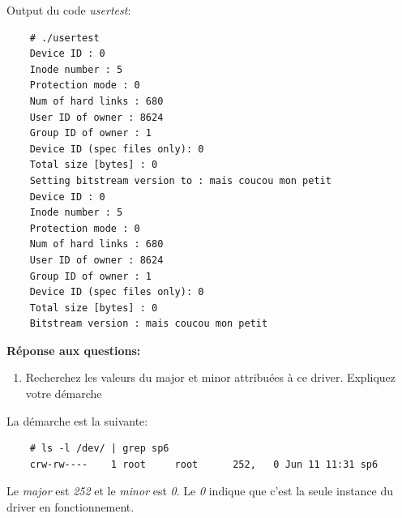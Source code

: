 Output du code \textit{usertest}:
\begin{lstlisting}
	# ./usertest 
	Device ID : 0
	Inode number : 5
	Protection mode : 0
	Num of hard links : 680
	User ID of owner : 8624
	Group ID of owner : 1
	Device ID (spec files only): 0
	Total size [bytes] : 0
	Setting bitstream version to : mais coucou mon petit                                                          
	Device ID : 0
	Inode number : 5
	Protection mode : 0
	Num of hard links : 680
	User ID of owner : 8624
	Group ID of owner : 1
	Device ID (spec files only): 0
	Total size [bytes] : 0
	Bitstream version : mais coucou mon petit  
\end{lstlisting}
\textbf{Réponse aux questions: }
\begin{enumerate}
	\item Recherchez les valeurs du major et minor attribuées à ce driver. Expliquez votre démarche\\
\end{enumerate}
La démarche est la suivante:
\begin{lstlisting}
	# ls -l /dev/ | grep sp6
	crw-rw----    1 root     root      252,   0 Jun 11 11:31 sp6
\end{lstlisting}
Le \textit{major} est \textit{252} et le \textit{minor} est \textit{0}. Le \textit{0} indique que c'est la seule instance du driver en fonctionnement.


